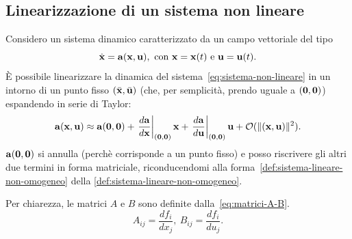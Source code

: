 \subsection{Linearizzazione di un sistema non lineare}
\label{subsec:linearizzazione}
Considero un sistema dinamico caratterizzato da un campo vettoriale del tipo
\begin{equation}
    \dot {\b x} = \b a(\b x, \b u),\ \text{con}\ \b x = \b x (t)\ \text e \ \b u = \b u (t).
    \label{eq:sistema-non-lineare}
\end{equation}
È possibile linearizzare la dinamica del sistema~\eqref{eq:sistema-non-lineare} in un intorno di un punto fisso
$(\bar{\mathbf{x}}, \bar{\mathbf{u}})$ (che, per semplicità, prendo uguale a $(\mathbf{0}, \mathbf{0})$) espandendo
in serie di Taylor:
\begin{equation}
    \mathbf{a}(\mathbf{x}, \mathbf{u}) \approx \mathbf{a}(\mathbf{0}, \mathbf{0}) +
    \left.\frac{d \mathbf{a}}{d \mathbf{x}}\right|_{(\mathbf{0}, \mathbf{0})} \mathbf{x} +
    \left.\frac{d \mathbf{a}}{d \mathbf{u}}\right|_{(\mathbf{0}, \mathbf{0})} \mathbf{u} + \mathcal O(\lVert(\mathbf{x}, \mathbf{u})\rVert^2).
    \label{eq:formula-linearizzazione}
\end{equation}
$\mathbf{a}(\mathbf{0}, \mathbf{0})$ si annulla (perchè corrisponde a un punto fisso) e posso riscrivere
gli altri due termini in forma matriciale, riconducendomi alla forma~\eqref{def:sistema-lineare-non-omogeneo}
della \autoref{def:sistema-lineare-non-omogeneo}.

Per chiarezza, le matrici $A$ e $B$ sono definite dalla~\eqref{eq:matrici-A-B}.
\begin{equation}
    A_{ij} = \frac{df_i}{dx_j},\ B_{ij} = \frac{df_i}{du_j}.
    \label{eq:matrici-A-B}
\end{equation}

